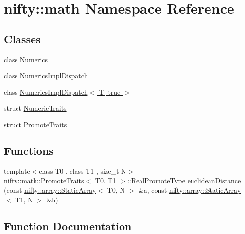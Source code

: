 \hypertarget{namespacenifty_1_1math}{}\section{nifty\+:\+:math Namespace Reference}
\label{namespacenifty_1_1math}
\subsection*{Classes}
\begin{DoxyCompactItemize}
\item 
class \hyperlink{classnifty_1_1math_1_1Numerics}{Numerics}
\item 
class \hyperlink{classnifty_1_1math_1_1NumericsImplDispatch}{Numerics\+Impl\+Dispatch}
\item 
class \hyperlink{classnifty_1_1math_1_1NumericsImplDispatch_3_01T_00_01true_01_4}{Numerics\+Impl\+Dispatch$<$ T, true $>$}
\item 
struct \hyperlink{structnifty_1_1math_1_1NumericTraits}{Numeric\+Traits}
\item 
struct \hyperlink{structnifty_1_1math_1_1PromoteTraits}{Promote\+Traits}
\end{DoxyCompactItemize}
\subsection*{Functions}
\begin{DoxyCompactItemize}
\item 
{\footnotesize template$<$class T0 , class T1 , size\+\_\+t N$>$ }\\\hyperlink{structnifty_1_1math_1_1PromoteTraits}{nifty\+::math\+::\+Promote\+Traits}$<$ T0, T1 $>$\+::Real\+Promote\+Type \hyperlink{namespacenifty_1_1math_a6abaaeb54bfe7300d2f3ae9186fe3ab0}{euclidean\+Distance} (const \hyperlink{namespacenifty_1_1array_a683f151f19c851754e0c6d55ed16a0c2}{nifty\+::array\+::\+Static\+Array}$<$ T0, N $>$ \&a, const \hyperlink{namespacenifty_1_1array_a683f151f19c851754e0c6d55ed16a0c2}{nifty\+::array\+::\+Static\+Array}$<$ T1, N $>$ \&b)
\end{DoxyCompactItemize}


\subsection{Function Documentation}
\mbox{\label{namespacenifty_1_1math_a6abaaeb54bfe7300d2f3ae9186fe3ab0}} 
